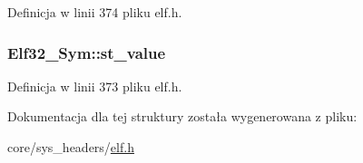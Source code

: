 Definicja w linii 374 pliku elf.\-h.

\hypertarget{struct_elf32___sym_abf8ff76884bc5e2acb5f7eb42f733c2e}{
\subsubsection[{st\-\_\-value}]{ Elf32\-\_\-\-Sym\-::st\-\_\-value}}\label{struct_elf32___sym_abf8ff76884bc5e2acb5f7eb42f733c2e}


Definicja w linii 373 pliku elf.\-h.



Dokumentacja dla tej struktury została wygenerowana z pliku\-:\begin{DoxyCompactItemize}
\item 
core/sys\-\_\-headers/\hyperlink{elf_8h}{elf.\-h}\end{DoxyCompactItemize}

